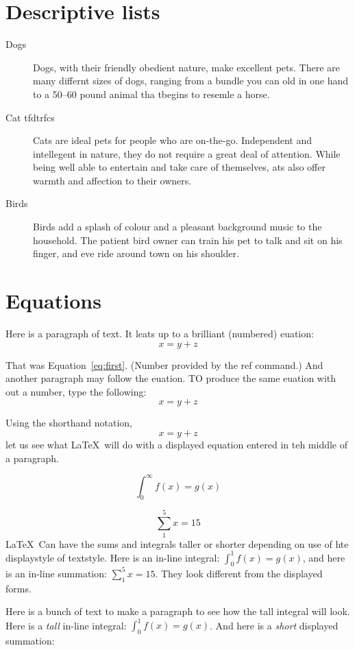 \documentclass[12pt,twoside,leqno]{article}%
\begin{document}
\section{Descriptive lists}
\begin{description}
\item [Dogs] Dogs, with their friendly obedient nature, make excellent pets. There are many differnt sizes of dogs, ranging from a bundle you can old in one hand to a 50--60 pound animal tha tbegins to resemle a horse.
\item [Cat tfdtrfcs] Cats are ideal pets for people who are on-the-go. Independent and intellegent in nature, they do not require a great deal of attention. While being well able to entertain and take care of themselves, ats also offer warmth and affection to their owners.
\item [Birds] Birds add a splash of colour and a pleasant background music to the household. The patient bird owner can train his pet to talk and sit on his finger, and eve ride around town on his shoulder.
\end{description}
\section{Equations}
Here is a paragraph of text. It leats up to a brilliant (numbered) euation:
\begin{equation}
x=y+z
\label{eq:first}
\end{equation}

That was Equation~\ref{eq:first}.  (Number provided by the ref command.) And another paragraph may follow the euation. TO produce the same euation with out a number, type the following:
\begin{displaymath}
x=y+z
\end{displaymath}

Using the shorthand notation, \[x=y+z\] let us see what \LaTeX\ will do with a displayed equation entered in teh middle of a paragraph.

\begin{equation}
\int_{0}^{\infty} f(x)=g(x)
\end{equation}

\[
\sum_{1}^{5}x=15
\]
\LaTeX\ Can have the sums and integrals taller or shorter depending on use of hte displaystyle of textstyle. Here is an in-line integral: $\int_{0}^{1}f(x)=g(x)$, and here is an in-line summation: $\sum_{1}^{5} x =15$. They look different from the displayed forms.

Here is a bunch of text to make a paragraph to see how the tall integral will look. Here is a {\it tall} in-line integral: $\displaystyle \int_{0}^{1}f(x)=g(x)$. And here is a {\it short} displayed summation:
\end{document}

